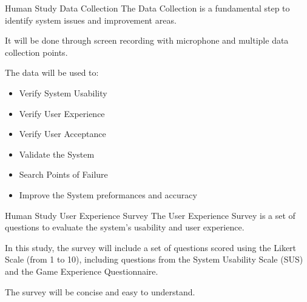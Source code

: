 \begin{frame}{Human Study \textemdash{} Data Collection}
    The Data Collection is a fundamental step to identify system issues and improvement areas.

    It will be done through screen recording with microphone and multiple data collection points.

    The data will be used to:
    \begin{itemize}
        \item Verify System Usability
        \item Verify User Experience
        \item Verify User Acceptance
        \item Validate the System
        \item Search Points of Failure
        \item Improve the System preformances and accuracy
    \end{itemize}
\end{frame}
\begin{frame}{Human Study \textemdash{} User Experience Survey}
    The User Experience Survey is a set of questions to evaluate the system's usability and user experience.

    \vspace{.5cm}
    In this study, the survey will include a set of questions scored using the Likert Scale (from 1 to 10), including questions from the System Usability Scale (SUS) and the Game Experience Questionnaire.

    \vspace*{.5cm}
    The survey will be concise and easy to understand.
\end{frame}
